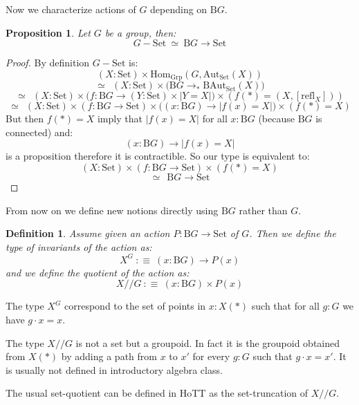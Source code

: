\documentclass{article}
\renewcommand{\r}{\rightarrow}
\newcommand{\refl}{\mathrm{refl}}
\newcommand{\Grp}{\mathrm{Grp}}
\newcommand{\Hom}{\mathrm{Hom}}
\newcommand{\B}{\mathrm{B}}
\newcommand{\Aut}{\mathrm{Aut}}
\newcommand{\Set}{\mathrm{Set}}
\newtheorem{definition}{Definition}
\newtheorem{proposition}{Proposition}
\begin{document}
Now we characterize actions of $G$ depending on $\B G$.

\begin{proposition}
Let $G$ be a group, then:
\[G-\Set \ \simeq \ \B G\r \Set\]
\end{proposition}
\begin{proof}
By definition $G-\Set$ is:
\[(X:\Set)\times \Hom_\Grp(G,\Aut_\Set(X))\]
\[\simeq \ \ (X:\Set)\times \big(\B G \r_*\B\Aut_\Set(X)\big)\]
\[\simeq \ \ (X:\Set)\times \big(f : \B G \r (Y:\Set)\times |Y=X|\big) \times (f(*) = (X,[\refl_X]))\]
\[\simeq \ \ (X:\Set)\times (f : \B G \r \Set)\times \big((x:\B G) \r |f(x) = X|\big) \times (f(*) = X)\]
But then $f(*) = X$ imply that $|f(x) = X|$ for all $x:\B G$ (because $\B G$ is connected) and:
\[(x:\B G) \r |f(x) = X|\]
 is a proposition therefore it is contractible. So our type is equivalent to:
\[(X:\Set)\times (f : \B G \r \Set)\times (f(*) = X)\]
\[\simeq \ \ \B G\r \Set\]
\end{proof}

From now on we define new notions directly using $\B G$ rather than $G$.

\begin{definition}
Assume given an action $P:\B G\r \Set$ of $G$. Then we define the type of invariants of the action as:
\[X^G \ :\equiv \ (x:\B G)\r P(x)\]
and we define the quotient of the action as:
\[X//G \ :\equiv\ (x:\B G)\times P(x)\]
\end{definition}

The type $X^G$ correspond to the set of points in $x:X(*)$ such that for all $g:G$ we have $g\cdot x = x$.%

The type $X//G$ is not a set but a groupoid. In fact it is the groupoid obtained from $X(*)$ by adding a path from $x$ to $x'$ for every $g:G$ such that $g\cdot x = x'$. It is usually not defined in introductory algebra class. 

The usual set-quotient can be defined in HoTT as the set-truncation of $X//G$.%
\end{document}
